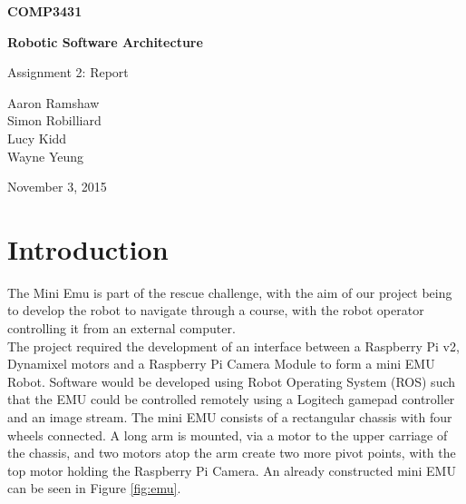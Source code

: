 \documentclass[titlepage,12pt,a4paper]{article}
\begin{document}
\begin{titlepage}
    \begin{center}
        \vspace*{3cm}
        
        \Huge
        \textbf{COMP3431\\}
        \title{}
        \vspace{0.5cm}
        \Huge
        \textbf{Robotic Software Architecture}
        
        \vspace{0.54cm}
        
        \Large
        Assignment 2: Report
        
        \vspace{5cm}

	\normalsize
	Aaron Ramshaw\\
	Simon Robilliard\\
    Lucy Kidd\\
	Wayne Yeung
        
	\vfill
        
        \Large
        November 3, 2015
        
    \end{center}
\end{titlepage}

\pagebreak

\section{Introduction}
The Mini Emu is part of the rescue challenge, with the aim of our project being to develop the robot to navigate through a course, with the robot operator controlling it from an external computer.\\

\noindent The project required the development of an interface between a Raspberry Pi v2, Dynamixel motors and a Raspberry Pi Camera Module to form a mini EMU Robot. Software would be developed using Robot Operating System (ROS) such that the EMU could be controlled remotely using a Logitech gamepad controller and an image stream. The mini EMU consists of a rectangular chassis with four wheels connected. A long arm is mounted, via a motor to the upper carriage of the chassis, and two motors atop the arm create two more pivot points, with the top motor holding the Raspberry Pi Camera. An already constructed mini EMU can be seen in Figure \ref{fig:emu}.
\end{document}
